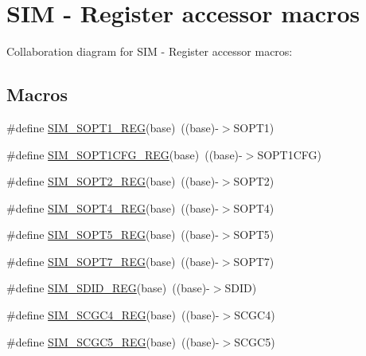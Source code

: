 \hypertarget{group___s_i_m___register___accessor___macros}{}\section{S\+IM -\/ Register accessor macros}
\label{group___s_i_m___register___accessor___macros}
Collaboration diagram for S\+IM -\/ Register accessor macros\+:
\subsection*{Macros}
\begin{DoxyCompactItemize}
\item 
\#define \hyperlink{group___s_i_m___register___accessor___macros_ga3b7afc5db335a5be8aaa37f7fbecff72}{S\+I\+M\+\_\+\+S\+O\+P\+T1\+\_\+\+R\+EG}(base)~((base)-\/$>$S\+O\+P\+T1)
\item 
\#define \hyperlink{group___s_i_m___register___accessor___macros_ga4c047f7ef6bc896bec677567db485e0c}{S\+I\+M\+\_\+\+S\+O\+P\+T1\+C\+F\+G\+\_\+\+R\+EG}(base)~((base)-\/$>$S\+O\+P\+T1\+C\+FG)
\item 
\#define \hyperlink{group___s_i_m___register___accessor___macros_ga49ff604bc1be3844a25f00a1a6b7649d}{S\+I\+M\+\_\+\+S\+O\+P\+T2\+\_\+\+R\+EG}(base)~((base)-\/$>$S\+O\+P\+T2)
\item 
\#define \hyperlink{group___s_i_m___register___accessor___macros_gaf236970c4ed2d9aa01898ca0f361b6e5}{S\+I\+M\+\_\+\+S\+O\+P\+T4\+\_\+\+R\+EG}(base)~((base)-\/$>$S\+O\+P\+T4)
\item 
\#define \hyperlink{group___s_i_m___register___accessor___macros_gac3deed6e684a7bdf2dcb7559e1f183c0}{S\+I\+M\+\_\+\+S\+O\+P\+T5\+\_\+\+R\+EG}(base)~((base)-\/$>$S\+O\+P\+T5)
\item 
\#define \hyperlink{group___s_i_m___register___accessor___macros_ga1859f3465bc7759ea1727d66791a4c27}{S\+I\+M\+\_\+\+S\+O\+P\+T7\+\_\+\+R\+EG}(base)~((base)-\/$>$S\+O\+P\+T7)
\item 
\#define \hyperlink{group___s_i_m___register___accessor___macros_ga3ce5dc30bb52a91ee8b83b564ebc8f11}{S\+I\+M\+\_\+\+S\+D\+I\+D\+\_\+\+R\+EG}(base)~((base)-\/$>$S\+D\+ID)
\item 
\#define \hyperlink{group___s_i_m___register___accessor___macros_ga38eed3f9464ac97fb6dd04184291c220}{S\+I\+M\+\_\+\+S\+C\+G\+C4\+\_\+\+R\+EG}(base)~((base)-\/$>$S\+C\+G\+C4)
\item 
\#define \hyperlink{group___s_i_m___register___accessor___macros_gacbcf62e33427e5aabbfe947adf619d25}{S\+I\+M\+\_\+\+S\+C\+G\+C5\+\_\+\+R\+EG}(base)~((base)-\/$>$S\+C\+G\+C5)

\end{DoxyCompactItemize}
